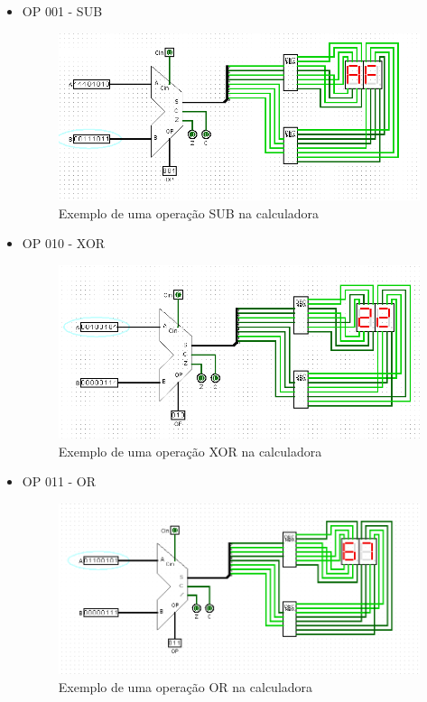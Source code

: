 \documentclass[
	12pt,				%
	openright,			%
	twoside,			%
	a4paper,			%
	english,			%
	french,				%
	spanish,			%
	brazil,				%
	]{abntex2}
\begin{document}
\begin{apendicesenv}
\begin{itemize}
\item{OP 001 - SUB}

\begin{figure}[H]
	\begin{center}
	    \includegraphics[scale=0.55]{calc001sub.png}
	\end{center}
\caption{\label{calc001sub}Exemplo de uma operação SUB na calculadora}
\end{figure}

\newpage
\item{OP 010 - XOR}

\begin{figure}[H]
	\begin{center}
	    \includegraphics[scale=0.55]{calc010xor.png}
	\end{center}
\caption{\label{calc010xor}Exemplo de uma operação XOR na calculadora}
\end{figure}

\item{OP 011 - OR}

\begin{figure}[H]
	\begin{center}
	    \includegraphics[scale=0.55]{calc011or.png}
	\end{center}
\caption{\label{calc011or}Exemplo de uma operação OR na calculadora}
\end{figure}


\end{itemize}
\end{apendicesenv}
\end{document}
